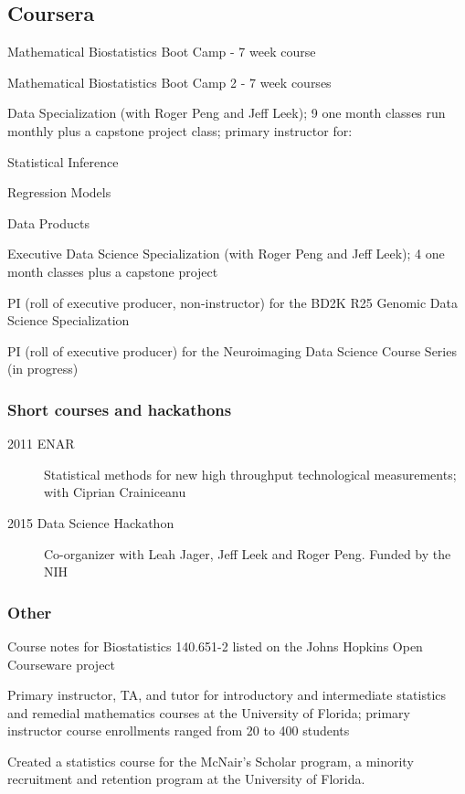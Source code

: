 \documentclass[12pt]{article}
\begin{document}
\subsection*{Coursera}
\begin{description}
\item Mathematical Biostatistics Boot Camp - 7 week course 
\item Mathematical Biostatistics Boot Camp 2 - 7 week courses 
\item Data Specialization (with Roger Peng and Jeff Leek); 9 one month classes run monthly plus a 
capstone project class; primary instructor for:
\begin{description}
\item Statistical Inference
\item Regression Models
\item Data Products
\end{description}
\item Executive Data Science Specialization (with Roger Peng and Jeff Leek); 4 one month classes plus a capstone project
\item PI (roll of executive producer, non-instructor) for the BD2K R25 Genomic Data Science Specialization
\item PI (roll of executive producer) for the Neuroimaging Data Science Course Series (in progress)
\end{description}

\subsubsection*{Short courses and hackathons}
\begin{description}
\item[\textnormal{2011 ENAR}] Statistical methods for new high throughput technological measurements; with Ciprian Crainiceanu
\item[\textnormal{2015 Data Science Hackathon}] Co-organizer with
Leah Jager, Jeff Leek and Roger Peng. Funded by the NIH
\end{description}


\subsubsection*{Other} 
\begin{description}
\item Course notes for Biostatistics 140.651-2 listed on the Johns Hopkins Open Courseware project 
\item Primary instructor, TA, and tutor for introductory and intermediate statistics and remedial mathematics 
courses at the University of Florida; primary instructor course enrollments ranged from 20 to 400 
students 
\item Created a statistics course for the McNair’s Scholar program, a minority recruitment and retention 
program at the University of Florida. 
\end{description}
\end{document}
